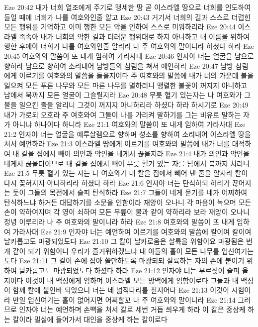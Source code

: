 Eze 20:42  내가 너희 열조에게 주기로 맹세한 땅 곧 이스라엘 땅으로 너희를 인도하여 들일 때에 너희가 나를 여호와인줄 알고
Eze 20:43  거기서 너희의 길과 스스로 더럽힌 모든 행위를 기억하고 이미 행한 모든 악을 인하여 스스로 미워하리라
Eze 20:44  이스라엘 족속아 내가 너희의 악한 길과 더러운 행위대로 하지 아니하고 내 이름을 위하여 행한 후에야 너희가 나를 여호와인줄 알리라 나 주 여호와의 말이니라 하셨다 하라
Eze 20:45  여호와의 말씀이 또 내게 임하여 가라사대
Eze 20:46  인자야 너는 얼굴을 남으로 향하라 남으로 향하여 소리내어 남방들의 삼림을 쳐서 예언하라
Eze 20:47  남방 삼림에게 이르기를 여호와의 말씀을 들을지어다 주 여호와의 말씀에 내가 너의 가운데 불을 일으켜 모든 푸른 나무와 모든 마른 나무를 멸하리니 맹렬한 불꽃이 꺼지지 아니하고 남에서 북까지 모든 얼굴이 그슬릴지라
Eze 20:48  무릇 혈기 있는자는 나 여호와가 그 불을 일으킨 줄을 알리니 그것이 꺼지지 아니하리라 하셨다 하라 하시기로
Eze 20:49  내가 가로되 오호라 주 여호와여 그들이 나를 가리켜 말하기를 그는 비유로 말하는 자가 아니냐 하나이다 하니라
Eze 21:1  여호와의 말씀이 또 내게 임하여 가라사대
Eze 21:2  인자야 너는 얼굴을 예루살렘으로 향하며 성소를 향하여 소리내어 이스라엘 땅을 쳐서 예언하라
Eze 21:3  이스라엘 땅에게 이르기를 여호와의 말씀에 내가 너를 대적하여 내 칼을 집에서 빼어 의인과 악인을 네게서 끊을지라
Eze 21:4  내가 의인과 악인을 네게서 끊을터이므로 내 칼을 집에서 빼어 무릇 혈기 있는 자를 남에서 북까지 치리니
Eze 21:5  무릇 혈기 있는 자는 나 여호와가 내 칼을 집에서 빼어 낸 줄을 알지라 칼이 다시 꽂혀지지 아니하리라 하셨다 하라
Eze 21:6  인자야 너는 탄식하되 허리가 끊어지는 둣이 그들의 목전에서 슬피 탄식하라
Eze 21:7  그들이 네게 묻기를 네가 어찌하여 탄식하느냐 하거든 대답하기를 소문을 인함이라 재앙이 오나니 각 마음이 녹으며 모든 손이 약하여지며 각 영이 쇠하며 모든 무릎이 물과 같이 약하리라 보라 재앙이 오나니 정녕 이루리라 나 주 여호와의 말이니라 하라
Eze 21:8  여호와의 말씀이 또 내게 임하여 가라사대
Eze 21:9  인자야 너는 예언하여 이르기를 여호와의 말씀에 칼이여 칼이여 날카롭고도 마광되었도다
Eze 21:10  그 칼이 날카로움은 살륙을 위함이요 마광됨은 번개 같이 되기 위함이니 우리가 즐거워하겠느냐 내 아들의 홀이 모든 나무를 업신여기는도다
Eze 21:11  그 칼이 손에 잡아 쓸만하도록 마광되되 살륙하는 자의 손에 붙이기 위하여 날카롭고도 마광되었도다 하셨다 하라
Eze 21:12  인자야 너는 부르짖어 슬피 울지어다 이것이 내 백성에게 임하며 이스라엘 모든 방백에게 임함이로다 그들과 내 백성이 함께 칼에 붙인바 되었으니 너는 네 넓적다리를 칠지어다
Eze 21:13  이것이 시험이라 만일 업신여기는 홀이 없어지면 어찌할꼬 나 주 여호와의 말이니라
Eze 21:14  그러므로 인자야 너는 예언하며 손뼉을 쳐서 칼로 세번 거듭 씌우게 하라 이 칼은 중상케 하는 칼이라 밀실에 들어가서 대인을 중상케 하는 칼이로다
